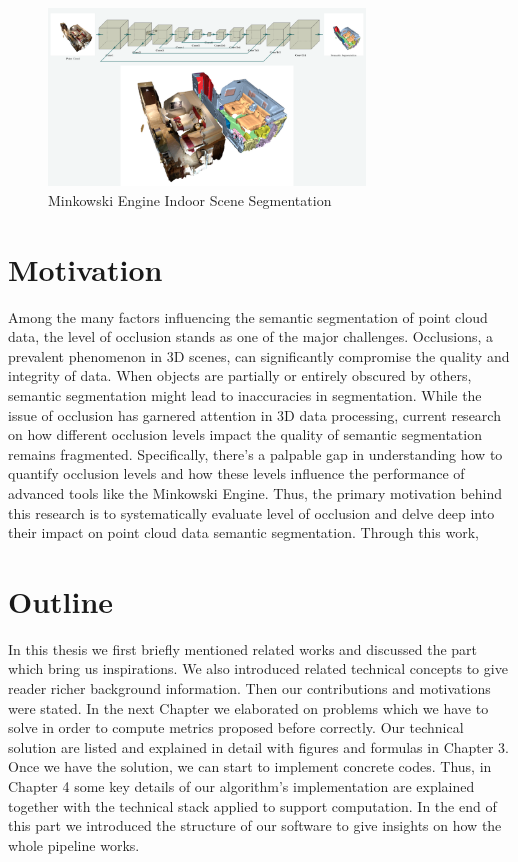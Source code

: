 \documentclass[11pt, a4paper,oneside,chapterprefix=false]{scrbook}
\begin{document}
\begin{figure}[h]
    \centering
    \includegraphics*[width=0.75\textwidth]{figures/Minkowski Engine.png}
    \caption{Minkowski Engine Indoor Scene Segmentation}
    \label{fig:minkowski}
\end{figure}


\section{Motivation} \label{sec:motivation}

Among the many factors influencing the semantic segmentation of point cloud data, the level of occlusion stands as one of the major 
challenges. Occlusions, a prevalent phenomenon in 3D scenes, can significantly compromise the quality and integrity of data. When objects are partially or entirely obscured by others, semantic segmentation might lead to inaccuracies in segmentation. While the issue of occlusion has garnered attention in 3D data processing, current research on how different occlusion levels impact the quality of semantic segmentation remains fragmented. Specifically, there's a palpable gap in understanding how to quantify occlusion levels and how these levels influence the performance of advanced tools like the Minkowski Engine. Thus, the primary motivation behind this research is to systematically evaluate level of occlusion and delve deep into their impact on point cloud data semantic segmentation. Through this work,

\section{Outline} \label{sec:outline}

In this thesis we first briefly mentioned related works and discussed the part which bring us inspirations. We also introduced related technical concepts to give reader richer background information. Then our contributions and motivations were stated. In the next Chapter we elaborated on problems which we have to solve in order to compute metrics proposed before correctly. Our technical solution are listed and explained in detail with figures and formulas in Chapter 3. Once we have the solution, we can start to implement concrete codes. Thus, in Chapter 4 some key details of our algorithm's implementation are explained together with the technical stack applied to support computation. In the end of this part we introduced the structure of our software to give insights on how the whole pipeline works.
\end{document}

